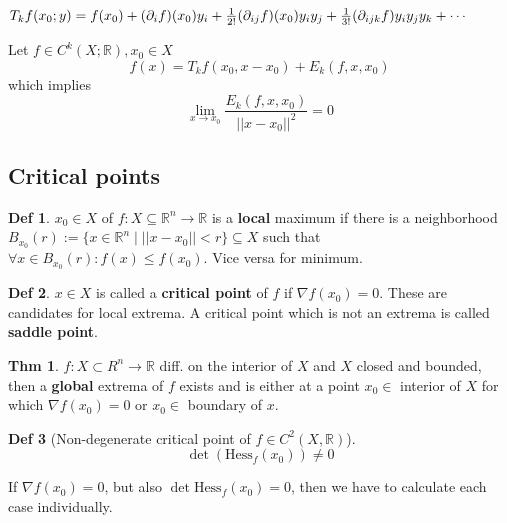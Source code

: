 \documentclass[a4paper, 10pt]{article}
\theoremstyle{definition}
\newtheorem*{theorem}{Thm}
\newtheorem*{definition}{Def}
\newcommand{\R}{\mathbb{R}}
\newcommand{\Hess}{\text{Hess}}
\begin{document}
\begin{note*}
    \(T_kf(x_0;y) = f(x_0) + (\partial_if)(x_0)y_i + \frac{1}{2!}(\partial_{ij}f)(x_0)y_iy_j \newline + \frac{1}{3!}(\partial_{ijk}f)y_iy_jy_k + \cdots\)
\end{note*}

\begin{ntheorem*}
    Let \(f \in C^k(X; \R), x_0 \in X\)
    \[f(x) = T_k f(x_0, x - x_0) + E_k(f, x, x_0)\]
    which implies
    \[\lim_{x \to x_0} \frac{E_k(f, x, x_0)}{||x - x_0||^2} = 0\]
\end{ntheorem*}

\pagebreak
\subsection{Critical points}
\begin{definition}
    \(x_0 \in X\) of \(f: X \subseteq \R^n \to \R\) is a \textbf{local} maximum if there is a neighborhood \(B_{x_0}(r) := \{x \in \R^n \mid ||x - x_0|| < r\} \subseteq X \) such that \(\forall x \in B_{x_0}(r): f(x) \leq f(x_0)\). Vice versa for minimum.
\end{definition}

\begin{definition}
    \(x \in X\) is called a \textbf{critical point} of \(f\) if \(\nabla f(x_0) = 0\). These are candidates for local extrema. A critical point which is not an extrema is called  \textbf{saddle point}.
\end{definition}

\begin{theorem}
    \(f: X \subset R^n \to \R\) diff. on the interior of \(X\) and \(X\) closed and bounded, then a \textbf{global} extrema of \(f\) exists and is either at a point \(x_0 \in\) interior of \(X\) for which \(\nabla f(x_0) = 0\) or \(x_0 \in\) boundary of \(x\).
\end{theorem}

\begin{definition}[Non-degenerate critical point of \(f \in C^2(X, \R)\)]
    \[\det(\Hess_f(x_0)) \neq 0\]
\end{definition}

\begin{note*}
    If \(\nabla f(x_0) = 0\), but also \(\det \Hess_f(x_0) = 0\), then we have to calculate each case individually.
\end{note*}
\end{document}
